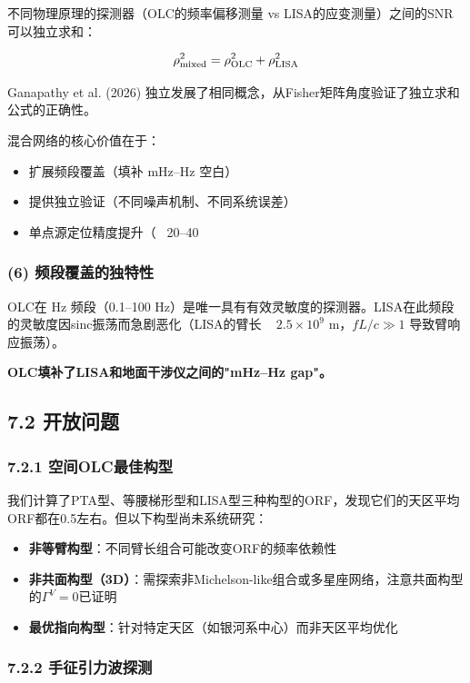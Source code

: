\documentclass[12pt,a4paper]{article}
\begin{document}
不同物理原理的探测器（OLC的频率偏移测量 vs LISA的应变测量）之间的SNR可以独立求和：

$$\rho_{\rm mixed}^2 = \rho_{\rm OLC}^2 + \rho_{\rm LISA}^2$$

Ganapathy et al. (2026) 独立发展了相同概念，从Fisher矩阵角度验证了独立求和公式的正确性。

混合网络的核心价值在于：
\begin{itemize}
  \item 扩展频段覆盖（填补 mHz–Hz 空白）
  \item 提供独立验证（不同噪声机制、不同系统误差）
  \item 单点源定位精度提升（~ 20–40%

\end{itemize}
\subsubsection{(6) 频段覆盖的独特性}


OLC在 Hz 频段（0.1–100 Hz）是唯一具有有效灵敏度的探测器。LISA在此频段的灵敏度因sinc振荡而急剧恶化（LISA的臂长 ~ $2.5 \times 10^9$ m，$fL/c \gg 1$ 导致臂响应振荡）。

\textbf{OLC填补了LISA和地面干涉仪之间的"mHz–Hz gap"。}

\subsection{7.2 开放问题}


\subsubsection{7.2.1 空间OLC最佳构型}


我们计算了PTA型、等腰梯形型和LISA型三种构型的ORF，发现它们的天区平均ORF都在0.5左右。但以下构型尚未系统研究：

\begin{itemize}
  \item \textbf{非等臂构型}：不同臂长组合可能改变ORF的频率依赖性
  \item \textbf{非共面构型（3D）}：需探索非Michelson-like组合或多星座网络，注意共面构型的$\Gamma^V=0$已证明
  \item \textbf{最优指向构型}：针对特定天区（如银河系中心）而非天区平均优化
\end{itemize}

\subsubsection{7.2.2 手征引力波探测}
\end{document}
